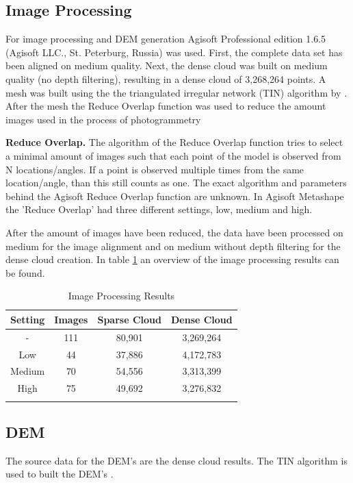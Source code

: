 \documentclass{isprs} %
\begin{document}
\subsection{Image Processing}
For image processing and DEM generation Agisoft Professional edition 1.6.5 (Agisoft LLC., St. Peterburg, Russia) was used.
First, the complete data set has been aligned on medium quality.
Next, the dense cloud was built on medium quality (no depth filtering), resulting in a dense cloud of 3,268,264 points.
A mesh was built using the the triangulated irregular network (TIN) algorithm by \citet{axelsson1999processing}. 
After the mesh the Reduce Overlap function was used to reduce the amount images used in the process of photogrammetry

\textbf{Reduce Overlap.} 
The algorithm of the Reduce Overlap function tries to select a minimal amount of images such that each point of the model is observed from N locations/angles.
If a point is observed multiple times from the same location/angle, than this still counts as one. 
The exact algorithm and parameters behind the Agisoft Reduce Overlap function are unknown.
In Agisoft Metashape the 'Reduce Overlap' had three different settings, low, medium and high. 

After the amount of images have been reduced, the data have been processed on medium for the image alignment and on medium without depth filtering for the dense cloud creation.
In table \ref{tab:ImageProcessing} an overview of the image processing results can be found.

\begin{table}[htb]
    \centering
    \caption{Image Processing Results}
    \begin{tabular}{@{}cccc@{}}
    \toprule
    \textbf{Setting} & \textbf{Images} & \multicolumn{1}{l}{\textbf{Sparse Cloud}} & \multicolumn{1}{l}{\textbf{Dense Cloud}} \\ \midrule
    -      & 111 & 80,901 & 3,269,264 \\
    Low    & 44  & 37,886 & 4,172,783 \\
    Medium & 70  & 54,556 & 3,313,399 \\
    High   & 75  & 49,692 & 3,276,832 \\ \bottomrule
    \label{tab:ImageProcessing}
\end{tabular}
\end{table}






\subsection{DEM}
The source data for the DEM's are the dense cloud results. 
The TIN algorithm is used to built the DEM's \citep{axelsson1999processing}.



\sloppy




{
	\begin{spacing}{1.17}
		\normalsize
	\end{spacing}
}



\vspace{1cm}
\end{document}
